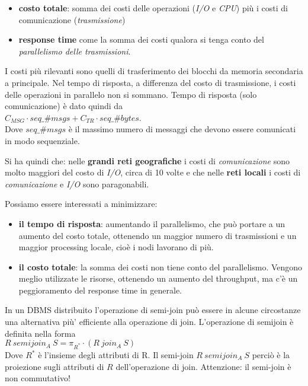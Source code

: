 \begin{itemize}
\begin{itemize}
        \item \textbf{costo totale}: somma dei costi delle operazioni (\textit{I/O} e \textit{CPU}) più i costi di comunicazione (\textit{trasmissione}) 
        \item \textbf{response time} come la somma dei costi qualora si tenga conto del \textit{parallelismo delle trasmissioni}.
    \end{itemize} 
    I costi più rilevanti sono quelli di trasferimento dei blocchi da memoria secondaria a principale. Nel tempo di risposta, a differenza del costo di trasmissione, i costi delle operazioni in parallelo non si sommano. Tempo di risposta (solo comunicazione) è dato quindi da \\ $C_{MSG} \cdot seq\_ \#msgs + C_{TR} \cdot seq\_ \#bytes$. \\
    Dove $seq\_ \#msgs$ è il massimo numero di messaggi che devono essere comunicati in modo sequenziale.
    
    Si ha quindi che: nelle \textbf{grandi reti geografiche} i costi di \textit{comunicazione} sono molto maggiori del costo di \textit{I/O}, circa di 10 volte e che nelle \textbf{reti locali} i costi di \textit{comunicazione} e \textit{I/O} sono paragonabili.
    
    Possiamo essere interessati a minimizzare: 
    \begin{itemize}
        \item \textbf{il tempo di risposta}: aumentando il parallelismo, che può portare a un aumento del costo totale, ottenendo un maggior numero di trasmissioni e un maggior processing locale, cioè i nodi lavorano di più. 
        \item \textbf{il costo totale}: la somma dei costi non tiene conto del parallelismo. Vengono meglio utilizzate le risorse, ottenendo un aumento del throughput, ma c’è un peggioramento del response time in generale.
    \end{itemize}
    
    In un DBMS distribuito l’operazione di semi-join può essere in alcune circostanze una alternativa più’ efficiente alla operazione di join. L'operazione di semijoin è definita nella forma \\ $R \ semijoin_A  \ S = \pi_{R^*}\cdot (R \ join_A\  S)$\\ Dove $R^*$ è l'insieme degli attributi di R. Il semi-join $R \ semijoin_A  \ S$ perciò è la proiezione sugli attributi di $R$ dell’operazione di join. Attenzione: il semi-join è non commutativo!
    

\end{itemize}

